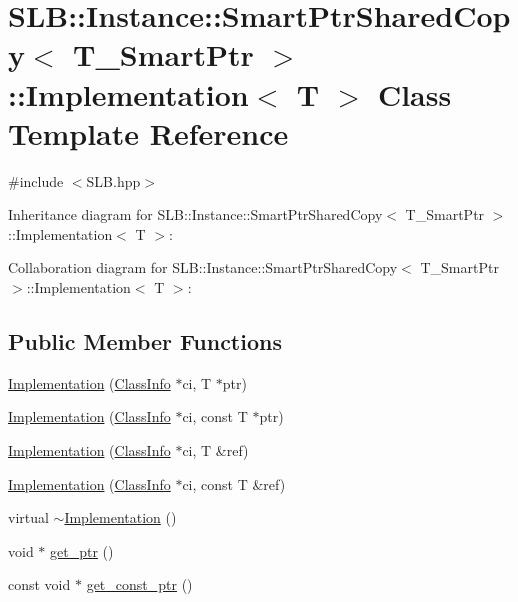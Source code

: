 \hypertarget{classSLB_1_1Instance_1_1SmartPtrSharedCopy_1_1Implementation}{}\section{S\+LB\+:\+:Instance\+:\+:Smart\+Ptr\+Shared\+Copy$<$ T\+\_\+\+Smart\+Ptr $>$\+:\+:Implementation$<$ T $>$ Class Template Reference}
\label{classSLB_1_1Instance_1_1SmartPtrSharedCopy_1_1Implementation}


{\ttfamily \#include $<$S\+L\+B.\+hpp$>$}



Inheritance diagram for S\+LB\+:\+:Instance\+:\+:Smart\+Ptr\+Shared\+Copy$<$ T\+\_\+\+Smart\+Ptr $>$\+:\+:Implementation$<$ T $>$\+:


Collaboration diagram for S\+LB\+:\+:Instance\+:\+:Smart\+Ptr\+Shared\+Copy$<$ T\+\_\+\+Smart\+Ptr $>$\+:\+:Implementation$<$ T $>$\+:
\subsection*{Public Member Functions}
\begin{DoxyCompactItemize}
\item 
\hyperlink{classSLB_1_1Instance_1_1SmartPtrSharedCopy_1_1Implementation_a8b790f72265a11dfa3584dfa719c39c7}{Implementation} (\hyperlink{classSLB_1_1ClassInfo}{Class\+Info} $\ast$ci, T $\ast$ptr)
\item 
\hyperlink{classSLB_1_1Instance_1_1SmartPtrSharedCopy_1_1Implementation_a3519aac7409ea4545dd05d86bcd319f8}{Implementation} (\hyperlink{classSLB_1_1ClassInfo}{Class\+Info} $\ast$ci, const T $\ast$ptr)
\item 
\hyperlink{classSLB_1_1Instance_1_1SmartPtrSharedCopy_1_1Implementation_aa03696fa82496625ff06f883d6de278f}{Implementation} (\hyperlink{classSLB_1_1ClassInfo}{Class\+Info} $\ast$ci, T \&ref)
\item 
\hyperlink{classSLB_1_1Instance_1_1SmartPtrSharedCopy_1_1Implementation_abd8dd6d7272ade173bae642d06b62274}{Implementation} (\hyperlink{classSLB_1_1ClassInfo}{Class\+Info} $\ast$ci, const T \&ref)
\item 
virtual \hyperlink{classSLB_1_1Instance_1_1SmartPtrSharedCopy_1_1Implementation_a31c91a2aff836c0e3fb2901f40cd85e8}{$\sim$\+Implementation} ()
\item 
void $\ast$ \hyperlink{classSLB_1_1Instance_1_1SmartPtrSharedCopy_1_1Implementation_a57134f83316a8c34da2375f436ac8fdc}{get\+\_\+ptr} ()
\item 
const void $\ast$ \hyperlink{classSLB_1_1Instance_1_1SmartPtrSharedCopy_1_1Implementation_a1a3ac4e795c65bd8c0748aebd65850a9}{get\+\_\+const\+\_\+ptr} ()
\end{DoxyCompactItemize}
